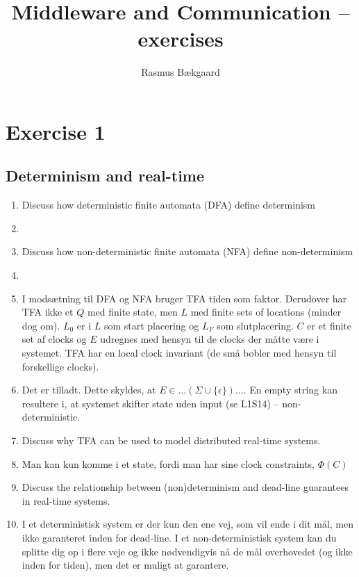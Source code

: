 \documentclass[oneside, 10pt]{article}
\title{Middleware and Communication -- exercises}
\author{Rasmus Bækgaard}
\date{}
\begin{document}
\maketitle


\section{Exercise 1}
\subsection{Determinism and real-time}
\begin{enumerate}
	\item Discuss how deterministic finite automata (DFA) define determinism
	\item[] 
	
	\item Discuss how non-deterministic finite automata (NFA) define non-determinism
	\item[]

	\item I modsætning til DFA og NFA bruger TFA tiden som faktor.
	Derudover har TFA ikke et $Q$ med finite state, men $L$ med finite sets of locations (minder dog om). 
	$L_0$ er i $L$ som start placering og $L_F$ som slutplacering.
	$C$ er et finite set af clocks og $E$ udregnes med hensyn til de clocks der måtte være i systemet.
	TFA har en local clock invariant (de små bobler med hensyn til forskellige clocks).

	\item Det er tilladt. Dette skyldes, at $E \in \ldots ( \Sigma \cup \{ \epsilon \}) \ldots$. En empty string kan resultere i, at systemet skifter state uden input (se L1S14) -- non-deterministic.

	\item  Discuss why TFA can be used to model distributed real-time systems.
	\item[] Man kan kun komme i et state, fordi man har sine clock constraints, $\Phi(C)$

	\item  Discuss the relationship between (non)determinism and dead-line guarantees in real-time systems.
	\item[] I et deterministisk system er der kun den ene vej, som vil ende i dit mål, men ikke garanteret inden for dead-line. 
	I et non-deterministisk system kan du splitte dig op i flere veje og ikke nødvendigvis nå de mål overhovedet (og ikke inden for tiden), men det er muligt at garantere.
\end{enumerate}
\end{document}
